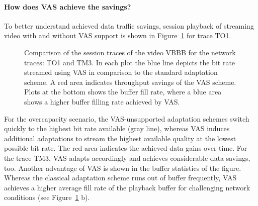 \paragraph{How does VAS achieve the savings?}
To better understand achieved data traffic savings, session playback of streaming video with and without \ac{VAS} support is shown in Figure~\ref{fig:730_tracesAndBuffer} for trace TO1. 
\begin{figure}[!h]
 \centering
 \caption[VAS session traces for trace: TO1 and TM3]{Comparison of the session traces of the video VBBB for the network traces: TO1 and TM3. In each plot the blue line depicts the bit rate streamed using VAS in comparison to the standard adaptation scheme. A red area indicates throughput savings of the VAS scheme. Plots at the bottom shows the buffer fill rate, where a blue area shows a higher buffer filling rate achieved by VAS.}
 \label{fig:730_tracesAndBuffer}
\end{figure}
For the overcapacity scenario, the \ac{VAS}-unsupported adaptation schemes switch quickly to the highest bit rate available (gray line), whereas \ac{VAS} induces additional adaptations to stream the highest available quality at the lowest possible bit rate.
The red area indicates the achieved data gains over time.
For the trace TM3, \ac{VAS} adapts accordingly and achieves considerable data savings, too.
Another advantage of \ac{VAS} is shown in the buffer statistics of the figure. 
Whereas the classical adaptation scheme runs out of buffer frequently, \ac{VAS} achieves a higher average fill rate of the playback buffer for challenging network conditions (see Figure~\ref{fig:730_tracesAndBuffer} b). 

